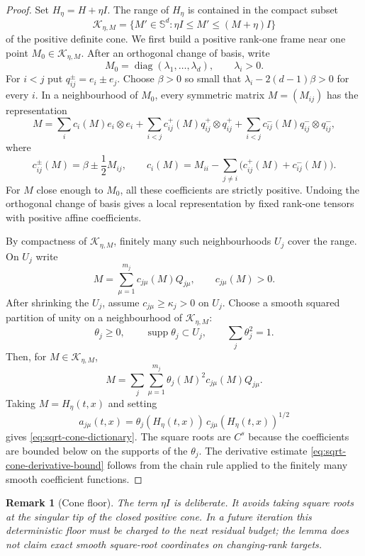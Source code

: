 \documentclass[11pt]{article}
\numberwithin{equation}{section}
\newtheorem{remark}[theorem]{Remark}
\newcommand{\Sym}{\mathbb S}
\begin{document}
\begin{proof}
Set \(H_\eta=H+\eta I\).  The range of \(H_\eta\) is contained in the compact
subset
\[
  \mathcal K_{\eta,M}
  =
  \{M'\in\Sym^d:\eta I\le M'\le(M+\eta)I\}
\]
of the positive definite cone.  We first build a positive rank-one frame near
one point \(M_0\in\mathcal K_{\eta,M}\).  After an orthogonal change of basis,
write
\[
  M_0=\operatorname{diag}(\lambda_1,\ldots,\lambda_d),
  \qquad \lambda_i>0.
\]
For \(i<j\) put \(q_{ij}^\pm=e_i\pm e_j\).  Choose \(\beta>0\) so small that
\(\lambda_i-2(d-1)\beta>0\) for every \(i\).  In a neighbourhood of \(M_0\),
every symmetric matrix \(M=(M_{ij})\) has the representation
\[
  M=
  \sum_i c_i(M)e_i\otimes e_i
  +\sum_{i<j}c_{ij}^+(M)q_{ij}^+\otimes q_{ij}^+
  +\sum_{i<j}c_{ij}^-(M)q_{ij}^-\otimes q_{ij}^- ,
\]
where
\[
  c_{ij}^\pm(M)=\beta\pm \frac12 M_{ij},
  \qquad
  c_i(M)=M_{ii}-\sum_{j\ne i}\bigl(c_{ij}^+(M)+c_{ij}^-(M)\bigr).
\]
For \(M\) close enough to \(M_0\), all these coefficients are strictly
positive.  Undoing the orthogonal change of basis gives a local representation
by fixed rank-one tensors with positive affine coefficients.

By compactness of \(\mathcal K_{\eta,M}\), finitely many such neighbourhoods
\(U_j\) cover the range.  On \(U_j\) write
\[
  M=\sum_{\mu=1}^{m_j}c_{j\mu}(M)Q_{j\mu},
  \qquad c_{j\mu}(M)>0 .
\]
After shrinking the \(U_j\), assume \(c_{j\mu}\ge\kappa_j>0\) on \(U_j\).
Choose a smooth squared partition of unity on a neighbourhood of
\(\mathcal K_{\eta,M}\):
\[
  \theta_j\ge0,\qquad \operatorname{supp}\theta_j\subset U_j,
  \qquad \sum_j\theta_j^2=1 .
\]
Then, for \(M\in\mathcal K_{\eta,M}\),
\[
  M=
  \sum_j\sum_{\mu=1}^{m_j}
  \theta_j(M)^2 c_{j\mu}(M)Q_{j\mu}.
\]
Taking \(M=H_\eta(t,x)\) and setting
\[
  a_{j\mu}(t,x)
  =
  \theta_j(H_\eta(t,x))\,c_{j\mu}(H_\eta(t,x))^{1/2}
\]
gives \eqref{eq:sqrt-cone-dictionary}.  The square roots are \(C^s\) because
the coefficients are bounded below on the supports of the \(\theta_j\).
The derivative estimate \eqref{eq:sqrt-cone-derivative-bound} follows from
the chain rule applied to the finitely many smooth coefficient functions.
\end{proof}

\begin{remark}[Cone floor]
\label{rem:cone-floor}
The term \(\eta I\) is deliberate.  It avoids taking square roots at the
singular tip of the closed positive cone.  In a future iteration this
deterministic floor must be charged to the next residual budget; the lemma
does not claim exact smooth square-root coordinates on changing-rank targets.
\end{remark}
\end{document}

